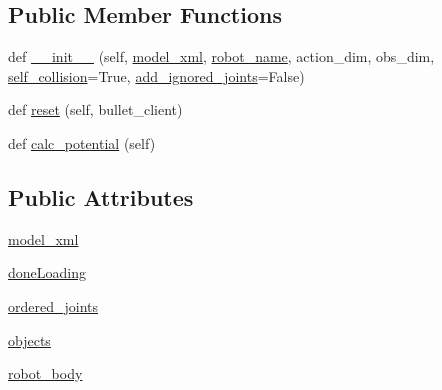 \subsection*{Public Member Functions}
\begin{DoxyCompactItemize}
\item 
def \hyperlink{classpybullet-gym_1_1pybulletgym_1_1envs_1_1mujoco_1_1robots_1_1robot__bases_1_1_m_j_c_f_based_robot_ae2551a780d344e8a58c79acbd3546f2a}{\+\_\+\+\_\+init\+\_\+\+\_\+} (self, \hyperlink{classpybullet-gym_1_1pybulletgym_1_1envs_1_1mujoco_1_1robots_1_1robot__bases_1_1_m_j_c_f_based_robot_a3da42cb56b34787fcc087a45c6158882}{model\+\_\+xml}, \hyperlink{classpybullet-gym_1_1pybulletgym_1_1envs_1_1mujoco_1_1robots_1_1robot__bases_1_1_xml_based_robot_a5cbeb6a59e6f3507b1786ab2c99dad77}{robot\+\_\+name}, action\+\_\+dim, obs\+\_\+dim, \hyperlink{classpybullet-gym_1_1pybulletgym_1_1envs_1_1mujoco_1_1robots_1_1robot__bases_1_1_xml_based_robot_aecec207b8ac56d1e4c6035ab29c49969}{self\+\_\+collision}=True, \hyperlink{classpybullet-gym_1_1pybulletgym_1_1envs_1_1mujoco_1_1robots_1_1robot__bases_1_1_xml_based_robot_a290307cdae32fb1a8e067fd2a5642861}{add\+\_\+ignored\+\_\+joints}=False)
\item 
def \hyperlink{classpybullet-gym_1_1pybulletgym_1_1envs_1_1mujoco_1_1robots_1_1robot__bases_1_1_m_j_c_f_based_robot_abb6cb62b1d5cf0d6585238f37ceb97a3}{reset} (self, bullet\+\_\+client)
\item 
def \hyperlink{classpybullet-gym_1_1pybulletgym_1_1envs_1_1mujoco_1_1robots_1_1robot__bases_1_1_m_j_c_f_based_robot_aeefe72cbee8acca2d2ba27ecc6163fcc}{calc\+\_\+potential} (self)
\end{DoxyCompactItemize}
\subsection*{Public Attributes}
\begin{DoxyCompactItemize}
\item 
\hyperlink{classpybullet-gym_1_1pybulletgym_1_1envs_1_1mujoco_1_1robots_1_1robot__bases_1_1_m_j_c_f_based_robot_a3da42cb56b34787fcc087a45c6158882}{model\+\_\+xml}
\item 
\hyperlink{classpybullet-gym_1_1pybulletgym_1_1envs_1_1mujoco_1_1robots_1_1robot__bases_1_1_m_j_c_f_based_robot_aa402d2f2e8025f1f6d4994427fd77d93}{done\+Loading}
\item 
\hyperlink{classpybullet-gym_1_1pybulletgym_1_1envs_1_1mujoco_1_1robots_1_1robot__bases_1_1_m_j_c_f_based_robot_a2130d75d80159d888c3706079aa4265d}{ordered\+\_\+joints}
\item 
\hyperlink{classpybullet-gym_1_1pybulletgym_1_1envs_1_1mujoco_1_1robots_1_1robot__bases_1_1_m_j_c_f_based_robot_a8d7e99dabe7ef2836c10dabc968f97e2}{objects}
\item 
\hyperlink{classpybullet-gym_1_1pybulletgym_1_1envs_1_1mujoco_1_1robots_1_1robot__bases_1_1_m_j_c_f_based_robot_af24f69bc06e9b31164a3b985f7bc6383}{robot\+\_\+body}
\end{DoxyCompactItemize}
